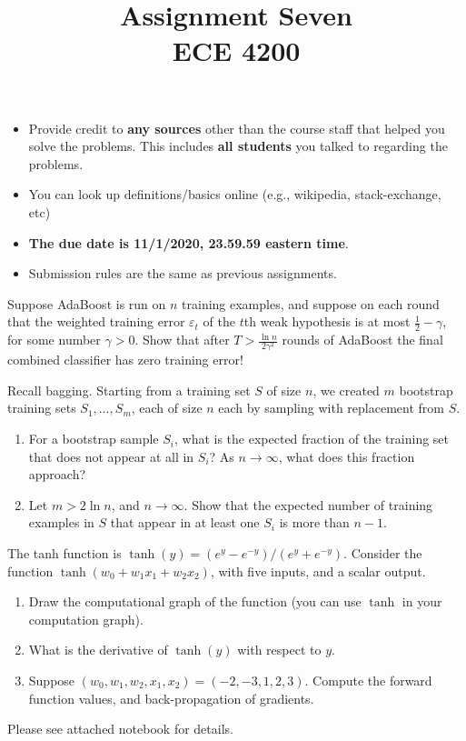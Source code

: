 \documentclass[11pt]{article}
\title{Assignment Seven\\ ECE 4200}
\newenvironment{problem}[2][Problem]{\begin{trivlist}
\item[\hskip \labelsep {\bfseries #1}\hskip \labelsep {\bfseries #2.}]}{\end{trivlist}}
\begin{document}
\maketitle 

\begin{itemize}
\item
Provide credit to \textbf{any sources} other than the course staff that helped you solve the problems. This includes \textbf{all students} you talked to regarding the problems. 	
\item
You can look up definitions/basics online (e.g., wikipedia, stack-exchange, etc)
\item
{\bf The due date is 11/1/2020, 23.59.59 eastern time}. 
\item
Submission rules are the same as previous assignments.
\end{itemize}



\begin{problem}{1. (10 points)}
Suppose AdaBoost is run on $n$ training examples, and suppose on each round that the weighted training error $\varepsilon_t$ of the $t$th weak hypothesis is at most $\frac12-\gamma$, for some number $\gamma>0$. Show that after $T>\frac{\ln n}{2\gamma^2}$ rounds of AdaBoost the final combined classifier has zero training error!
\end{problem}

\begin{problem}{2. (10 points)}
Recall bagging. Starting from a training set $S$ of size $n$, we created $m$ bootstrap training sets $S_1, \ldots, S_m$, each of size $n$ each by sampling with replacement from $S$.
\begin{enumerate}
\item 
For a bootstrap sample $S_i$, what is the expected fraction of the training set that does not appear at all in $S_i$? As $n\to\infty$, what does this fraction approach? 
\item
Let $m>2\ln n$, and $n\to\infty$. Show that the expected number of training examples in $S$ that appear in at least one $S_i$ is more than $n-1$. 
\end{enumerate}
\end{problem}

\begin{problem}{3. (10 points)}
The tanh function is $\tanh(y) = (e^y-e^{-y})/(e^y+e^{-y})$. Consider the function $\tanh(w_0+w_1x_1+w_2x_2)$, with five inputs, and a scalar output. 
\begin{enumerate}
\item 
Draw the computational graph of the function (you can use $\tanh$ in your computation graph).
\item
What is the derivative of $\tanh(y)$ with respect to $y$. 
\item
Suppose $(w_0, w_1, w_2, x_1, x_2) = (-2, -3, 1, 2, 3)$. Compute the forward function values, and back-propagation of gradients. 
\end{enumerate}	
\end{problem}


\begin{problem}{4. (30 points)} Please see attached notebook for details.
\end{problem}
\end{document}
